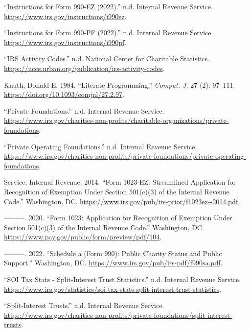 \documentclass[
  letterpaper,
  DIV=11,
  numbers=noendperiod,
  oneside]{scrreprt}
\newlength{\cslhangindent}
\newlength{\cslentryspacingunit} %
\newenvironment{CSLReferences}[2] %
 {%
  \setlength{\parindent}{0pt}
  \ifodd #1
  \let\oldpar\par
  \def\par{\hangindent=\cslhangindent\oldpar}
  \fi
  \setlength{\parskip}{#2\cslentryspacingunit}
 }%
 {}
\begin{document}
\begin{CSLReferences}{1}{0}
\leavevmode{}%
{``Instructions for Form 990-EZ (2022).''} n.d. Internal Revenue
Service. \url{https://www.irs.gov/instructions/i990ez}.

\leavevmode{}%
{``Instructions for Form 990-PF (2022).''} n.d. Internal Revenue
Service. \url{https://www.irs.gov/instructions/i990pf}.

\leavevmode{}%
{``IRS Activity Codes.''} n.d. National Center for Charitable
Statistics. \url{https://nccs.urban.org/publication/irs-activity-codes}.

\leavevmode{}%
Knuth, Donald E. 1984. {``Literate Programming.''} \emph{Comput. J.} 27
(2): 97--111. \url{https://doi.org/10.1093/comjnl/27.2.97}.

\leavevmode{}%
{``Private Foundations.''} n.d. Internal Revenue Service.
\url{https://www.irs.gov/charities-non-profits/charitable-organizations/private-foundations}.

\leavevmode{}%
{``Private Operating Foundations.''} n.d. Internal Revenue Service.
\url{https://www.irs.gov/charities-non-profits/private-foundations/private-operating-foundations}.

\leavevmode{}%
Service, Internal Revenue. 2014. {``Form 1023-EZ: Streamlined
Application for Recognition of Exemption Under Section 501(c)(3) of the
Internal Revenue Code.''} Washington, DC.
\url{https://www.irs.gov/pub/irs-prior/f1023ez--2014.pdf}.

\leavevmode{}%
---------. 2020. {``Form 1023: Application for Recognition of Exemption
Under Section 501(c)(3) of the Internal Revenue Code.''} Washington, DC.
\url{https://www.pay.gov/public/form/preview/pdf/104}.

\leavevmode{}%
---------. 2022. {``Schedule a (Form 990): Public Charity Status and
Public Support.''} Washington, DC.
\url{https://www.irs.gov/pub/irs-pdf/f990sa.pdf}.

\leavevmode{}%
{``SOI Tax Stats - Split-Interest Trust Statistics.''} n.d. Internal
Revenue Service.
\url{https://www.irs.gov/statistics/soi-tax-stats-split-interest-trust-statistics}.

\leavevmode{}%
{``Split-Interest Trusts.''} n.d. Internal Revenue Service.
\url{https://www.irs.gov/charities-non-profits/private-foundations/split-interest-trusts}.

\end{CSLReferences}
\end{document}
